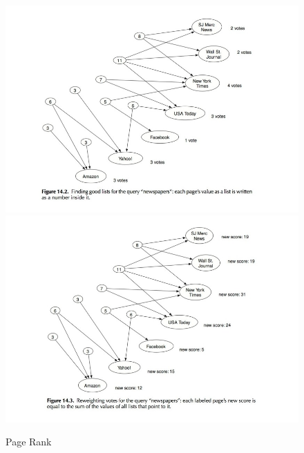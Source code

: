 \begin{figure}
\centering
\includegraphics[scale=0.5]{images/ref/fig-14-2.jpeg}
\includegraphics[scale=0.5]{images/ref/fig-14-3.jpeg}
\caption{Page Rank}
\label{pageRankNews1}
\end{figure}

